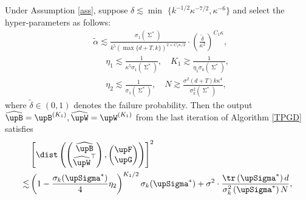 
\begin{theorem}\label{theorem1}
Under Assumption \ref{ass}, suppose $\delta\lesssim\min$ $\{k^{-1/2}\kappa^{-7/2},\kappa^{-6}\}$ and select the hyper-parameters as follows:
\begin{equation}\label{parameter-setting-learning-representation}
    \begin{aligned}
    &\widetilde{\alpha}\lesssim\frac{\sigma_1(\upSigma^*)}{k^5\left(\max\{d+T,k\}\right)^{2+C_1\kappa/2}}\cdot\left(\frac{\widetilde{\delta}}{\kappa^2}\right)^{C_1\kappa},\\
    &\, \, \, \, \, \, \, \, \, \eta_1\lesssim\frac{1}{\kappa^5\sigma_1(\upSigma^*)},\quad K_1\gtrsim\frac{1}{\eta_1\sigma_k(\upSigma^*)},\\
    &\, \, \, \, \, \, \, \, \, \eta_2\lesssim\frac{1}{\sigma_1(\upSigma^*)},\quad N\gtrsim\frac{\sigma^2(d+T)k\kappa^4}{\sigma_k^2(\upSigma^*)},
    \end{aligned}
\end{equation}
where $\widetilde{\delta}\in(0,1)$ denotes the failure probability. Then the output $\widehat{\upB}=\upB^{(K_1)}, \widehat{\upW}=\upW^{(K_1)}$ from the last iteration of Algorithm \ref{TPGD} satisfies
\begin{align*}
    &\left[\dist\left(\begin{pmatrix}
        \widehat{\upB}\\
        \widehat{\upW}^{\top}
    \end{pmatrix}, \begin{pmatrix}
        \upF\\
        \upG
    \end{pmatrix}\right)\right]^2
    \\
    \lesssim&\left(1-\frac{\sigma_k(\upSigma^*)}{4}\eta_2\right)^{K_1/2}\sigma_k(\upSigma^*)+{\sigma^2}\cdot\frac{\tr\left(\upSigma^*\right)d}{\sigma_k^2\left(\upSigma^*\right)N},
\end{align*}
\end{theorem}

